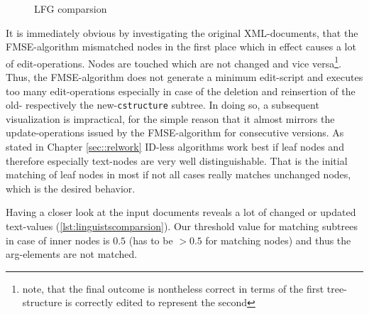 \begin{figure}[tb]
\caption{\label{fig:lfg} LFG comparsion}
\end{figure}

It is immediately obvious by investigating the original XML-documents, that the FMSE-algorithm mismatched nodes in the first place which in effect causes a lot of edit-operations. Nodes are touched which are not changed and vice versa\footnote{note, that the final outcome is nontheless correct in terms of the first tree-structure is correctly edited to represent the second}. Thus, the FMSE-algorithm does not generate a minimum edit-script and executes too many edit-operations especially in case of the deletion and reinsertion of the old- respectively the new-\texttt{cstructure} subtree. In doing so, a subsequent visualization is impractical, for the simple reason that it almost mirrors the update-operations issued by the FMSE-algorithm for consecutive versions. As stated in Chapter \ref{sec::relwork} ID-less algorithms work best if leaf nodes and therefore especially text-nodes are very well distinguishable. That is the initial matching of leaf nodes in most if not all cases really matches unchanged nodes, which is the desired behavior. 

Having a closer look at the input documents reveals a lot of changed or updated text-values (\ref{lst:linguistscomparsion}). Our threshold value for matching subtrees in case of inner nodes is $0.5$ (has to be $> 0.5$ for matching nodes) and thus the arg-elements are not matched.

